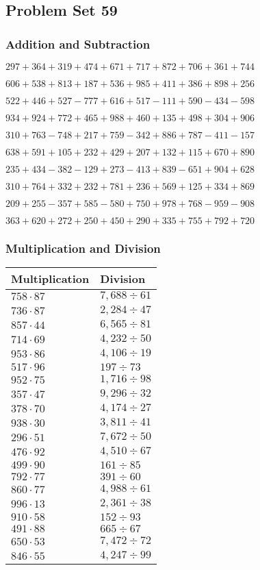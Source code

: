 \hypertarget{problem-set-59-1}{%
\subsection{Problem Set 59}\label{problem-set-59-1}}

\hypertarget{addition-and-subtraction-159}{%
\subsubsection{Addition and
Subtraction}\label{addition-and-subtraction-159}}

\(297 + 364 + 319 + 474 + 671 + 717 + 872 + 706 + 361 + 744\)

\(606 + 538 + 813 + 187 + 536 + 985 + 411 + 386 + 898 + 256\)

\(522 + 446 + 527 - 777 + 616 + 517 - 111 + 590 - 434 - 598\)

\(934 + 924 + 772 + 465 + 988 + 460 + 135 + 498 + 304 + 906\)

\(310 + 763 - 748 + 217 + 759 - 342 + 886 + 787 - 411 - 157\)

\(638 + 591 + 105 + 232 + 429 + 207 + 132 + 115 + 670 + 890\)

\(235 + 434 - 382 - 129 + 273 - 413 + 839 - 651 + 904 + 628\)

\(310 + 764 + 332 + 232 + 781 + 236 + 569 + 125 + 334 + 869\)

\(209 + 255 - 357 + 585 - 580 + 750 + 978 + 768 - 959 - 908\)

\(363 + 620 + 272 + 250 + 450 + 290 + 335 + 755 + 792 + 720\)

\hypertarget{multiplication-and-division-159}{%
\subsubsection{Multiplication and
Division}\label{multiplication-and-division-159}}

\begin{longtable}[]{@{}ll@{}}
\toprule
Multiplication & Division\tabularnewline
\midrule
\endhead
\(758 \cdot 87\) & \(7,688÷61\)\tabularnewline
\(736 \cdot 87\) & \(2,284÷47\)\tabularnewline
\(857 \cdot 44\) & \(6,565÷81\)\tabularnewline
\(714 \cdot 69\) & \(4,232÷50\)\tabularnewline
\(953 \cdot 86\) & \(4,106÷19\)\tabularnewline
\(517 \cdot 96\) & \(197÷73\)\tabularnewline
\(952 \cdot 75\) & \(1,716÷98\)\tabularnewline
\(357 \cdot 47\) & \(9,296÷32\)\tabularnewline
\(378 \cdot 70\) & \(4,174÷27\)\tabularnewline
\(938 \cdot 30\) & \(3,811÷41\)\tabularnewline
\(296 \cdot 51\) & \(7,672÷50\)\tabularnewline
\(476 \cdot 92\) & \(4,510÷67\)\tabularnewline
\(499 \cdot 90\) & \(161÷85\)\tabularnewline
\(792 \cdot 77\) & \(391÷60\)\tabularnewline
\(860 \cdot 77\) & \(4,988÷61\)\tabularnewline
\(996 \cdot 13\) & \(2,361÷38\)\tabularnewline
\(910 \cdot 58\) & \(152÷93\)\tabularnewline
\(491 \cdot 88\) & \(665÷67\)\tabularnewline
\(650 \cdot 53\) & \(7,472÷72\)\tabularnewline
\(846 \cdot 55\) & \(4,247÷99\)\tabularnewline
\bottomrule
\end{longtable}

